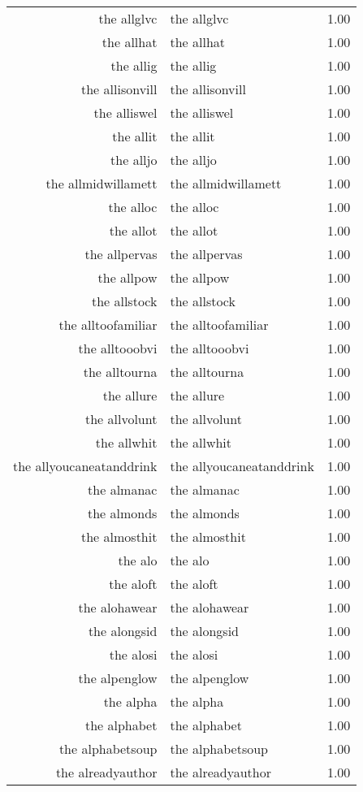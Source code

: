 \begin{table}[ht]
\begin{tabular}{rlr}
  the allglvc & the allglvc & 1.00 \\ 
  the allhat & the allhat & 1.00 \\ 
  the allig & the allig & 1.00 \\ 
  the allisonvill & the allisonvill & 1.00 \\ 
  the alliswel & the alliswel & 1.00 \\ 
  the allit & the allit & 1.00 \\ 
  the alljo & the alljo & 1.00 \\ 
  the allmidwillamett & the allmidwillamett & 1.00 \\ 
  the alloc & the alloc & 1.00 \\ 
  the allot & the allot & 1.00 \\ 
  the allpervas & the allpervas & 1.00 \\ 
  the allpow & the allpow & 1.00 \\ 
  the allstock & the allstock & 1.00 \\ 
  the alltoofamiliar & the alltoofamiliar & 1.00 \\ 
  the alltooobvi & the alltooobvi & 1.00 \\ 
  the alltourna & the alltourna & 1.00 \\ 
  the allure & the allure & 1.00 \\ 
  the allvolunt & the allvolunt & 1.00 \\ 
  the allwhit & the allwhit & 1.00 \\ 
  the allyoucaneatanddrink & the allyoucaneatanddrink & 1.00 \\ 
  the almanac & the almanac & 1.00 \\ 
  the almonds & the almonds & 1.00 \\ 
  the almosthit & the almosthit & 1.00 \\ 
  the alo & the alo & 1.00 \\ 
  the aloft & the aloft & 1.00 \\ 
  the alohawear & the alohawear & 1.00 \\ 
  the alongsid & the alongsid & 1.00 \\ 
  the alosi & the alosi & 1.00 \\ 
  the alpenglow & the alpenglow & 1.00 \\ 
  the alpha & the alpha & 1.00 \\ 
  the alphabet & the alphabet & 1.00 \\ 
  the alphabetsoup & the alphabetsoup & 1.00 \\ 
  the alreadyauthor & the alreadyauthor & 1.00 \\ 

\end{tabular}
\end{table}
